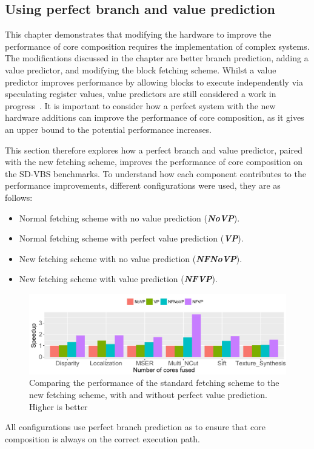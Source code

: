 \newcommand{\novp}{\textit{\textbf{NoVP}}}
\newcommand{\vp}{\textit{\textbf{VP}}}
\newcommand{\nfnovp}{\textit{\textbf{NFNoVP}}}
\newcommand{\nfvp}{\textit{\textbf{NFVP}}}

\subsection{Using perfect branch and value prediction}
This chapter demonstrates that modifying the hardware to improve the performance of core composition requires the implementation of complex systems.
The modifications discussed in the chapter are better branch prediction, adding a value predictor, and modifying the block fetching scheme.
Whilst a value predictor improves performance by allowing blocks to execute independently via speculating register values, value predictors are still considered a work in progress~\cite{peraisBeBop2015}.
It is important to consider how a perfect system with the new hardware additions can improve the performance of core composition, as it gives an upper bound to the potential performance increases.

This section therefore explores how a perfect branch and value predictor, paired with the new fetching scheme, improves the performance of core composition on the SD-VBS benchmarks.
To understand how each component contributes to the performance improvements, different configurations were used, they are as follows:
\begin{itemize}
\item Normal fetching scheme with no value prediction (\novp).
\vspace{-1em}
\item Normal fetching scheme with perfect value prediction (\vp).
\vspace{-1em}
\item New fetching scheme with no value prediction (\nfnovp).
\vspace{-1em}
\item New fetching scheme with value prediction (\nfvp).
\end{itemize}

\begin{figure}[t]
    \centering
    \includegraphics[width=1\textwidth]{chapter3/graphics/tempres.pdf}
    \caption{Comparing the performance of the standard fetching scheme to the new fetching scheme, with and without perfect value prediction. Higher is better}
    \label{fig:perf_pred}
\end{figure}
All configurations use perfect branch prediction as to ensure that core composition is always on the correct execution path.

